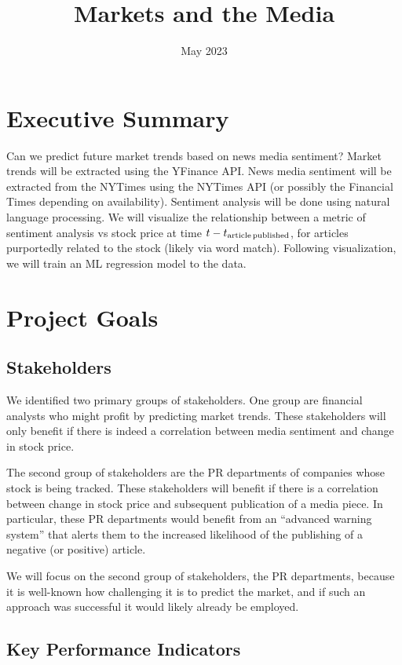 \documentclass{article}
\title{Markets and the Media}
\date{May 2023}
\begin{document}
\section*{Executive Summary}

Can we predict future market trends based on news media sentiment?
Market trends will be extracted using the YFinance API.
News media sentiment will be extracted from the NYTimes using the NYTimes API (or possibly the Financial Times depending on availability).
Sentiment analysis will be done using natural language processing.
We will visualize the relationship between a metric of sentiment analysis vs stock price at time $t - t_{\rm article\,published}$, for articles purportedly related to the stock (likely via word match).
Following visualization, we will train an ML regression model to the data.

\section*{Project Goals}

\subsection*{Stakeholders}

We identified two primary groups of stakeholders.
One group are financial analysts who might profit by predicting market trends.
These stakeholders will only benefit if there is indeed a correlation between media sentiment and change in stock price.

The second group of stakeholders are the PR departments of companies whose stock is being tracked.
These stakeholders will benefit if there is a correlation between change in stock price and subsequent publication of a media piece.
In particular, these PR departments would benefit from an ``advanced warning system'' that alerts them to the increased likelihood of the publishing of a negative (or positive) article.

We will focus on the second group of stakeholders, the PR departments, because it is well-known how challenging it is to predict the market, and if such an approach was successful it would likely already be employed.

\subsection*{Key Performance Indicators}
\end{document}
